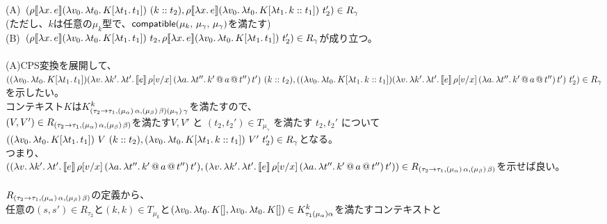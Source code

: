 (A)\ $(\rho \CPSTh{\Lam{x}{e}} \LamP{v_0}{\Lam{t_0}{K[\Lam{t_1}{t_1}]}}\ \ConsP{k}{t_2}, \rho \CPSTh{\Lam{x}{e}} \LamP{v_0}{\Lam{t_0}{K[\Lam{t_1}{\Cons{k}{t_1}}]}}\ t_2')\in R_{\gamma}$\\
(ただし、$k$は任意の$\mu_k$型で、$\Compatible{\mu_k}{\mu_{\gamma}}{\mu_{\gamma}}$を満たす)\\
  (B)\ $(\rho \CPSTh{\Lam{x}{e}} \LamP{v_0}{\Lam{t_0}{K[\Lam{t_1}{t_1}]}}\ t_2, \rho \CPSTh{\Lam{x}{e}} \LamP{v_0}{\Lam{t_0}{K[\Lam{t_1}{t_1}]}}\ t_2')\in R_{\gamma}$が成り立つ。\\
\\
(A)CPS変換を展開して、\\
$(\LamP{v_0}{\Lam{t_0}{K[\Lam{t_1}{t_1}]}}
          \LamP{v}{\Lam{k'}{\Lam{t'}{\CPS{e}{\rho[\Change{x}{v}]}
           {\LamP{a}{\Lam{t''}
               {\App{\App{k'}{a}}{t''}}}}{t'}}}}\ \ConsP{k}{t_2},\\
  (\LamP{v_0}{\Lam{t_0}{K[\Lam{t_1}{\Cons{k}{t_1}}]}}
          \LamP{v}{\Lam{k'}{\Lam{t'}{\CPS{e}{\rho[\Change{x}{v}]}
           {\LamP{a}{\Lam{t''}
               {\App{\App{k'}{a}}{t''}}}}{t'}}}}\ t_2')\in R_{\gamma}$を示したい。\\
コンテキスト$K$は$K^k_{\ArrowTrailP{\tau_2}{\tau_1}{\TrailType{\alpha}}{\TrailType{\beta}} \TrailType{\gamma}}$を満たすので、\\
$(V,V')\in R_{\ArrowTrailP{\tau_2}{\tau_1}{\TrailType{\alpha}}{\TrailType{\beta}}}$を満たす$V,V'$ と $(t_2, t_2') \in T_{\mu_{\gamma}}$ を満たす $t_2, t_2'$ について\\
$(\LamP{v_0}{\Lam{t_0}{K[\Lam{t_1}{t_1}]}}\ V\ \ConsP{k}{t_2}, \LamP{v_0}{\Lam{t_0}{K[\Lam{t_1}{\Cons{k}{t_1}}]}}\ V'\ t_2')\in R_{\gamma}$となる。\\
つまり、\\
      $(\LamP{v}{\Lam{k'}{\Lam{t'}{\CPS{e}{\rho[\Change{x}{v}]}
           {\LamP{a}{\Lam{t''}
               {\App{\App{k'}{a}}{t''}}}}{t'}}}},\\
         \LamP{v}{\Lam{k'}{\Lam{t'}{\CPS{e}{\rho[\Change{x}{v}]}
           {\LamP{a}{\Lam{t''}
               {\App{\App{k'}{a}}{t''}}}}{t'}}}})\in R_{\ArrowTrailP{\tau_2}{\tau_1}{\TrailType{\alpha}}{\TrailType{\beta}}}$を示せば良い。\\
\\
$R_{\ArrowTrailP{\tau_2}{\tau_1}{\TrailType{\alpha}}{\TrailType{\beta}}}$の定義から、\\
任意の$(s,s')\in R_{\tau_2}$と$(k,k)\in T_{\mu_k}$と$(\Lam{v_0}{\Lam{t_0}{K[]}}, \Lam{v_0}{\Lam{t_0}{K[]}})\in  K^k_{\tau_1(\mu_{\alpha})\alpha}$を満たすコンテキストと
